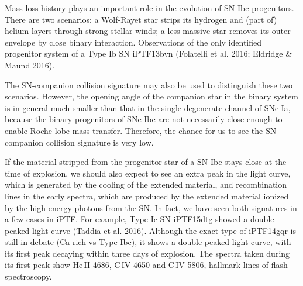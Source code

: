 \documentclass[11pt]{article}
\begin{document}
Mass loss history plays an important role in the evolution of SN Ibc
progenitors. There are two scenarios: a Wolf-Rayet star strips its
hydrogen and (part of) helium layers through strong stellar winds; a
less massive star removes its outer envelope by close binary
interaction. Observations of the only identified progenitor system of a
Type Ib SN iPTF13bvn (Folatelli et al. 2016; Eldridge \& Maund 2016).

The SN-companion collision signature may also be used to distinguish
these two scenarios. However, the opening angle of the companion star
in the binary system is in general much smaller than that in the
single-degenerate channel of SNe Ia, because the binary progenitors of
SNe Ibc are not necessarily close enough to enable Roche lobe mass
transfer. Therefore, the chance for us to see the SN-companion
collision signature is very low.

If the material stripped from the progenitor star of a SN Ibc stays
close at the time of explosion, we should also expect to see an extra
peak in the light curve, which is generated by the cooling of the
extended material, and recombination lines in the early spectra, which
are produced by the extended material ionized by the high-energy
photons from the SN. In fact, we have seen both signatures in a few
cases in iPTF. For example, Type Ic SN iPTF15dtg showed a
double-peaked light curve (Taddia et al. 2016). Although the exact
type of iPTF14gqr is still in debate (Ca-rich vs Type Ibc), it shows a
double-peaked light curve, with its first peak decaying within three
days of explosion. The spectra taken during its first peak show He\,II
4686, C\,IV 4650 and C\,IV 5806, hallmark lines of flash spectroscopy.

\end{document}
